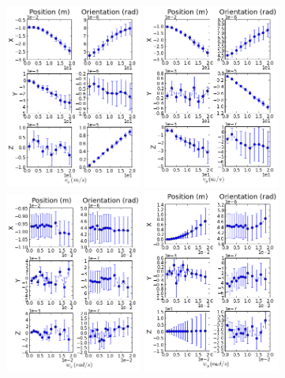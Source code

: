 \begin{figure}[h]
  \centering
  \includegraphics[width=4.5cm, keepaspectratio=true]{./Figures/SimulationFigures/Figure9.png}
  \includegraphics[width=4.5cm, keepaspectratio=true]{./Figures/SimulationFigures/Figure10.png}
  \includegraphics[width=4.5cm, keepaspectratio=true]{./Figures/SimulationFigures/Figure11.png}
  \includegraphics[width=4.5cm, keepaspectratio=true]{./Figures/SimulationFigures/Figure12.png}

\end{figure}
